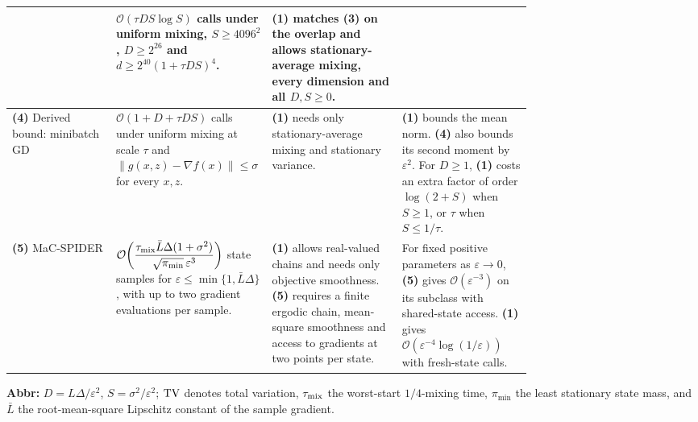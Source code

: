 \begin{table}[tp]
\begin{threeparttable}
\begin{tabularx}{\linewidth}{@{}>{\raggedright\arraybackslash}p{0.20\linewidth}>{\raggedright\arraybackslash}p{0.30\linewidth}>{\raggedright\arraybackslash}p{0.25\linewidth}>{\raggedright\arraybackslash}X@{}}
& $\mathcal{O}(\tau DS\log S)$ calls under uniform mixing, $S\ge 4096^2$, $D\ge2^{26}$ and $d\ge2^{40}(1+\tau DS)^4$.
& \textbf{(1)} matches \textbf{(3)} on the overlap and allows stationary-average mixing, every dimension and all $D,S\ge0$. & \\
\midrule
\textbf{(4)} Derived bound: minibatch GD \citep[Lem.~1]{ammsBeznosikov2023}
& $\mathcal{O}(1+D+\tau DS)$ calls under uniform mixing at scale $\tau$ and $\|g(x,z)-\nabla f(x)\|\le\sigma$ for every $x,z$.
& \textbf{(1)} needs only stationary-average mixing and stationary variance.
& \textbf{(1)} bounds the mean norm. \textbf{(4)} also bounds its second moment by $\varepsilon^2$. For $D\ge1$, \textbf{(1)} costs an extra factor of order $\log(2+S)$ when $S\ge1$, or $\tau$ when $S\le1/\tau$. \\
\midrule
\textbf{(5)} MaC-SPIDER \citep[Thm.~4.4]{ammsSunWei2025}
& $\mathcal{O}\!\left(\dfrac{\tau_{\rm mix}\bar L\Delta(1+\sigma^2)}{\sqrt{\pi_{\min}}\,\varepsilon^3}\right)$ state samples for $\varepsilon\le\min\{1,\bar L\Delta\}$, with up to two gradient evaluations per sample.
& \textbf{(1)} allows real-valued chains and needs only objective smoothness. \textbf{(5)} requires a finite ergodic chain, mean-square smoothness and access to gradients at two points per state.
& For fixed positive parameters as $\varepsilon\to0$, \textbf{(5)} gives $\mathcal{O}(\varepsilon^{-3})$ on its subclass with shared-state access. \textbf{(1)} gives $\mathcal{O}(\varepsilon^{-4}\log(1/\varepsilon))$ with fresh-state calls. \\
\bottomrule
\end{tabularx}
\begin{tablenotes}[flushleft]\footnotesize
\item[] \textbf{Abbr:} $D=L\Delta/\varepsilon^2$, $S=\sigma^2/\varepsilon^2$; $\rm TV$ denotes total variation, $\tau_{\rm mix}$ the worst-start $1/4$-mixing time, $\pi_{\min}$ the least stationary state mass, and $\bar L$ the root-mean-square Lipschitz constant of the sample gradient.
\end{tablenotes}
\end{threeparttable}
\end{table}
